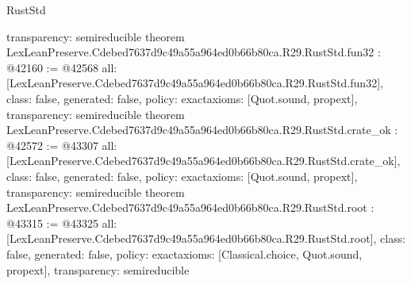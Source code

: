 \begin{lexlean}{RustStd}
\begin{coremodule}
{  transparency: semireducible
}
theorem LexLeanPreserve.Cdebed7637d9c49a55a964ed0b66b80ca.R29.RustStd.fun32 : @42160 := @42568 {
  all: [LexLeanPreserve.Cdebed7637d9c49a55a964ed0b66b80ca.R29.RustStd.fun32],
  class: false,
  generated: false,
  policy: exact{axioms: [Quot.sound, propext]},
  transparency: semireducible
}
theorem LexLeanPreserve.Cdebed7637d9c49a55a964ed0b66b80ca.R29.RustStd.crate_ok : @42572 := @43307 {
  all: [LexLeanPreserve.Cdebed7637d9c49a55a964ed0b66b80ca.R29.RustStd.crate_ok],
  class: false,
  generated: false,
  policy: exact{axioms: [Quot.sound, propext]},
  transparency: semireducible
}
theorem LexLeanPreserve.Cdebed7637d9c49a55a964ed0b66b80ca.R29.RustStd.root : @43315 := @43325 {
  all: [LexLeanPreserve.Cdebed7637d9c49a55a964ed0b66b80ca.R29.RustStd.root],
  class: false,
  generated: false,
  policy: exact{axioms: [Classical.choice, Quot.sound, propext]},
  transparency: semireducible
}


\end{coremodule}
\end{lexlean}

